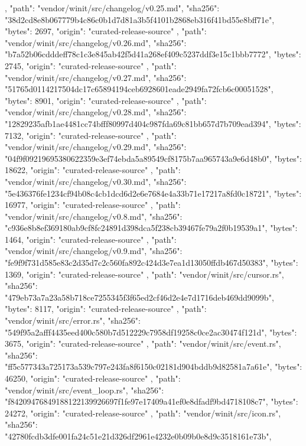 {{    },
    {
      "path": "vendor/winit/src/changelog/v0.25.md",
      "sha256": "38d2cd8e8b067779b4c86c0b1d7d81a3b5f4101b2868eb316f41bd55e8bff71e",
      "bytes": 2697,
      "origin": "curated-release-source"
    },
    {
      "path": "vendor/winit/src/changelog/v0.26.md",
      "sha256": "b7a52b06cdddeff78c1c3e845ab42f5d41a268ef409c5237ddf3e15c1bbb7772",
      "bytes": 2745,
      "origin": "curated-release-source"
    },
    {
      "path": "vendor/winit/src/changelog/v0.27.md",
      "sha256": "51765d0114217504dc17c65894194ceb6928601eade2949fa72fcb6c00051528",
      "bytes": 8901,
      "origin": "curated-release-source"
    },
    {
      "path": "vendor/winit/src/changelog/v0.28.md",
      "sha256": "12829235afb1ae4481cc74bfff80997d404c987fda69c81bb657d7b709ead394",
      "bytes": 7132,
      "origin": "curated-release-source"
    },
    {
      "path": "vendor/winit/src/changelog/v0.29.md",
      "sha256": "04f9f09219695380622359e3ef74ebda5a89549cf8175b7aa965743a9e6d48b0",
      "bytes": 18622,
      "origin": "curated-release-source"
    },
    {
      "path": "vendor/winit/src/changelog/v0.30.md",
      "sha256": "5e436376fe1234cf94b08c4cb1dcd6d2e6e7684e4a33b71e17217a8fd0c18721",
      "bytes": 16977,
      "origin": "curated-release-source"
    },
    {
      "path": "vendor/winit/src/changelog/v0.8.md",
      "sha256": "c936e8b8ef369180ab9cf8fc24891d398dca5f238cb39467fe79a2f0b19539a1",
      "bytes": 1464,
      "origin": "curated-release-source"
    },
    {
      "path": "vendor/winit/src/changelog/v0.9.md",
      "sha256": "fe9f9f731d585e83c2d35d7c2c560fa892c424d3e7ea1d13050ffdb467d50383",
      "bytes": 1369,
      "origin": "curated-release-source"
    },
    {
      "path": "vendor/winit/src/cursor.rs",
      "sha256": "479eb73a7a23a58b718ce7255345f3f65ed2cf46d2e4e7d1716deb469dd9099b",
      "bytes": 8117,
      "origin": "curated-release-source"
    },
    {
      "path": "vendor/winit/src/error.rs",
      "sha256": "549f95a2afff4435eed400c580b7d512229c7958df19258c0ce2ac30474f121d",
      "bytes": 3675,
      "origin": "curated-release-source"
    },
    {
      "path": "vendor/winit/src/event.rs",
      "sha256": "ff5c577343a725173a539c797e243fa8f6150c02181d904bddb9d82581a7a61e",
      "bytes": 46250,
      "origin": "curated-release-source"
    },
    {
      "path": "vendor/winit/src/event_loop.rs",
      "sha256": "f84209476849188122139926697f1fe97e17409a41ef0e8dfadf9bd4718108c7",
      "bytes": 24272,
      "origin": "curated-release-source"
    },
    {
      "path": "vendor/winit/src/icon.rs",
      "sha256": "42780fcdb3dfe001fa24c51e21d326df2961e4232e0b09b0e8d9c3518161e73b",
}}
